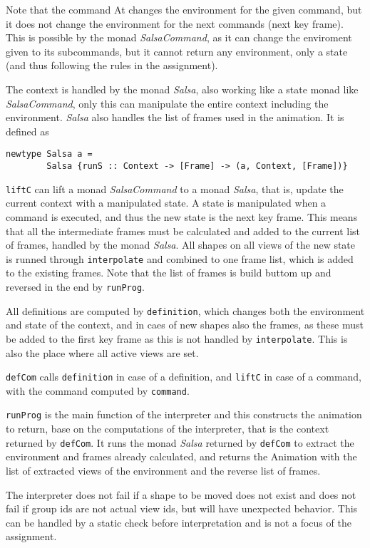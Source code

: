 \documentclass[a4paper, 10pt]{article}
\begin{document}
Note that the command At changes the environment for the given command, but it does not change the environment for the next commands (next key frame). This is possible by the monad \textit{SalsaCommand}, as it can change the enviroment given to its subcommands, but it cannot return any environment, only a state (and thus following the rules in the assignment).

The context is handled by the monad \textit{Salsa}, also working like a state monad like \textit{SalsaCommand}, only this can manipulate the entire context including the environment. \textit{Salsa} also handles the list of frames used in the animation. It is defined as
\begin{verbatim}
newtype Salsa a = 
        Salsa {runS :: Context -> [Frame] -> (a, Context, [Frame])}
\end{verbatim}

\texttt{liftC} can lift a monad \textit{SalsaCommand} to a monad \textit{Salsa}, that is, update the current context with a manipulated state. A state is manipulated when a command is executed, and thus the new state is the next key frame. This means that all the intermediate frames must be calculated and added to the current list of frames, handled by the monad \textit{Salsa}. All shapes on all views of the new state is runned through \texttt{interpolate} and combined to one frame list, which is added to the existing frames. Note that the list of frames is build buttom up and reversed in the end by \texttt{runProg}.

All definitions are computed by \texttt{definition}, which changes both the environment and state of the context, and in caes of new shapes also the frames, as these must be added to the first key frame as this is not handled by \texttt{interpolate}. This is also the place where all active views are set.

\texttt{defCom} calls \texttt{definition} in case of a definition, and \texttt{liftC} in case of a command, with the command computed by \texttt{command}.

\texttt{runProg} is the main function of the interpreter and this constructs the animation to return, base on the computations of the interpreter, that is the context returned by \texttt{defCom}. It runs the monad \textit{Salsa} returned by \texttt{defCom} to extract the environment and frames already calculated, and returns the Animation with the list of extracted views of the environment and the reverse list of frames.


The interpreter does not fail if a shape to be moved does not exist and does not fail if group ids are not actual view ids, but will have unexpected behavior.
This can be handled by a static check before interpretation and is not a focus of the assignment.
\end{document}
